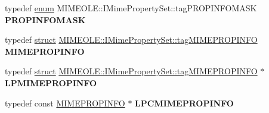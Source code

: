 \begin{DoxyCompactItemize}
typedef \hyperlink{interfaceenum}{enum} M\+I\+M\+E\+O\+L\+E\+::\+I\+Mime\+Property\+Set\+::tag\+P\+R\+O\+P\+I\+N\+F\+O\+M\+A\+SK {\bfseries P\+R\+O\+P\+I\+N\+F\+O\+M\+A\+SK}
\item 
\mbox{\label{interface_m_i_m_e_o_l_e_1_1_i_mime_property_set_ab10366fa6b20832177b9f2684e1c4212}} 
typedef \hyperlink{interfacestruct}{struct} \hyperlink{struct_m_i_m_e_o_l_e_1_1_i_mime_property_set_1_1tag_m_i_m_e_p_r_o_p_i_n_f_o}{M\+I\+M\+E\+O\+L\+E\+::\+I\+Mime\+Property\+Set\+::tag\+M\+I\+M\+E\+P\+R\+O\+P\+I\+N\+FO} {\bfseries M\+I\+M\+E\+P\+R\+O\+P\+I\+N\+FO}
\item 
\mbox{\label{interface_m_i_m_e_o_l_e_1_1_i_mime_property_set_a742c2dd2cfc43cc5d4b51c118a0c1d93}} 
typedef \hyperlink{interfacestruct}{struct} \hyperlink{struct_m_i_m_e_o_l_e_1_1_i_mime_property_set_1_1tag_m_i_m_e_p_r_o_p_i_n_f_o}{M\+I\+M\+E\+O\+L\+E\+::\+I\+Mime\+Property\+Set\+::tag\+M\+I\+M\+E\+P\+R\+O\+P\+I\+N\+FO} $\ast$ {\bfseries L\+P\+M\+I\+M\+E\+P\+R\+O\+P\+I\+N\+FO}
\item 
\mbox{\label{interface_m_i_m_e_o_l_e_1_1_i_mime_property_set_adf789e6fc21a68c31da602148e5e3579}} 
typedef const \hyperlink{struct_m_i_m_e_o_l_e_1_1_i_mime_property_set_1_1tag_m_i_m_e_p_r_o_p_i_n_f_o}{M\+I\+M\+E\+P\+R\+O\+P\+I\+N\+FO} $\ast$ {\bfseries L\+P\+C\+M\+I\+M\+E\+P\+R\+O\+P\+I\+N\+FO}
\end{DoxyCompactItemize}

